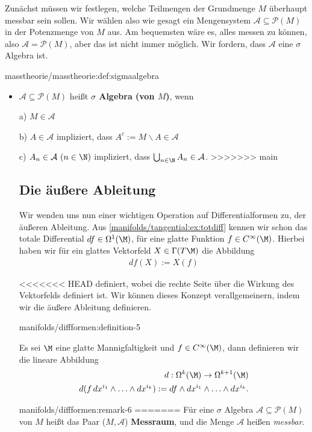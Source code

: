 \documentclass[letterpaper,10pt,english]{jupyterBook}
\begin{document}
\par
Zunächst müssen wir festlegen, welche Teilmengen der Grundmenge \(M\) überhaupt messbar sein sollen. Wir wählen also wie gesagt ein Mengensystem \(\mathcal{A} \subseteq \mathcal{P}(M)\) in der Potenzmenge von \(M\) aus.
Am bequemsten wäre es, alles messen zu können, also \(\mathcal{A} = \mathcal{P}(M)\), aber das ist nicht immer möglich. Wir fordern, dass \(\mathcal{A}\) eine \(\sigma\) Algebra ist.
\begin{definition}{}{masstheorie/masstheorie:def:sigmaalgebra}


\begin{itemize}
\item {} 
\par
\(\mathcal{A} \subseteq \mathcal{P}(M)\) heißt \textbf{\(\sigma\) Algebra (von \(M\))}, wenn

\par
a) \(M\in \mathcal{A}\)

\par
b) \(A\in \mathcal{A}\) impliziert, dass \(A^c:=M\backslash A\in \mathcal{A}\)

\par
c) \(A_n\in \mathcal{A}\ (n\in\N)\) impliziert, dass \(\bigcup_{n\in \N} A_n\in \mathcal{A}\).
>>>>>>> main


\subsection{Die äußere Ableitung}
\label{\detokenize{manifolds/diffformen:die-auszere-ableitung}}
\par
Wir wenden uns nun einer wichtigen Operation auf Differentialformen zu, der äußeren Ableitung. Aus \cref{manifolds/tangential:ex:totdiff} kennen wir schon das totale Differential \(df\in \Omega^1(\M)\), für eine glatte Funktion \(f\in C^\infty(\M)\). Hierbei haben wir für ein glattes Vektorfeld \(X\in \Gamma(T\M)\) die Abbildung
\begin{align*}
df(X) := X(f)
\end{align*}
\par
<<<<<<< HEAD
definiert, wobei die rechte Seite über die Wirkung des Vektorfelds definiert ist. Wir können dieses Konzept verallgemeinern, indem wir die äußere Ableitung definieren.
\begin{definition}{}{manifolds/diffformen:definition-5}



\par
Es sei \(\M\) eine glatte Mannigfaltigkeit und \(f\in C^\infty(\M)\), dann definieren wir die lineare Abbildung
\begin{align*}
d:\Omega^k(\M)\to \Omega^{k+1}(\M)\\
d(f\, dx^{i_1}\wedge\ldots\wedge dx^{i_k}):= df \wedge dx^{i_1}\wedge\ldots\wedge dx^{i_k}.
\end{align*}\end{definition}
\begin{remark}{}{manifolds/diffformen:remark-6}
=======
Für eine \(\sigma\) Algebra \(\mathcal{A} \subseteq \mathcal{P}(M)\) von \(M\) heißt das Paar (\(M,\mathcal{A}\)) \textbf{Messraum}, und die Menge \(\mathcal{A}\) heißen \emph{messbar}.


\end{remark}
\end{itemize}
\end{definition}
\end{document}
